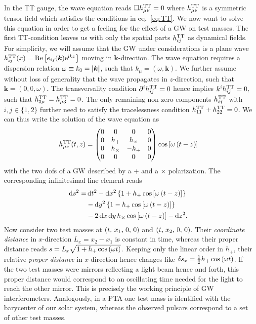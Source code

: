 In the \ac{TT} gauge, the wave equation reads $\square h_{{\mu \nu}}^{\text{TT}} = 0$ where $h_{{\mu \nu}}^{\text{TT}}$ is a symmetric tensor field which satisfies the conditions in eq.~\eqref{eq:TT}. We now want to solve this equation in order to get a feeling for the effect of a \ac{GW} on test masses. The first \ac{TT}-condition leaves us with only the spatial parts $h_{ij}^{\text{TT}}$ as dynamical fields. For simplicity, we will assume that the \ac{GW} under considerations is a  plane wave $h_{ij}^{\text{TT}}(x) = \text{Re} \left[ e_{ij}(\bm{k}) \mathrm{e}^{\mathrm{i}kx} \right]$ moving in $\bm{k}$-direction. The wave equation requires a dispersion relation $\omega \equiv k_0 = \lvert\bm{k}\rvert$, such that $k_\mu = (\omega, \bm{k})$. We further assume without loss of generality that the wave propagates in $z$-direction, such that $\bm{k} = (0,0,\omega)$. The transversality condition $\partial^i h_{ij}^{\text{TT}}=0$ hence implies $k^i h_{ij}^{\text{TT}}=0$, such that $h_{3\mu}^{\text{TT}} = h_{\mu3}^{\text{TT}} = 0$. The only remaining non-zero components $h_{ij}^{\text{TT}}$ with $i, j \in \{1, 2\}$ further need to satisfy the tracelessness condition $h_{11}^{\text{TT}} + h_{22}^{\text{TT}} = 0$. We can thus write the solution of the wave equation as
\begin{align}
	h_{\mu \nu}^{\text{TT}}(t,z) =
	\begin{pmatrix}
		0 &0 &0 &0\\
		0 &h_+ &h_\times &0\\
		0 &h_\times &-h_+ &0\\
		0 &0 &0 &0
	\end{pmatrix}
	\cos \left[ \omega \left( t-z \right) \right]
\end{align}
with the two \acp{dof} of a \ac{GW} described by a $+$ and a $\times$ polarization. The corresponding infinitesimal line element reads
\begin{align}
	\begin{split}
		\mathop{}\!\mathrm{d} s^2 =& \mathop{}\!\mathrm{d} t^2 - \mathop{}\!\mathrm{d} x^2 \left\{ 1 + h_+ \cos \left[ \omega \left( t-z \right) \right] \right\}\\
		&- \mathop{}\!\mathrm{d} y^2 \left\{ 1 - h_+ \cos \left[ \omega \left( t-z \right) \right] \right\} \\
		&- 2 \mathop{}\!\mathrm{d} x \mathop{}\!\mathrm{d} y \, h_\times \cos \left[ \omega \left( t-z \right) \right] - \mathop{}\!\mathrm{d} z^2 .
	\end{split}
\end{align}
Now consider two test masses at $\left( t, \, x_1, \,  0, \, 0 \right)$ and $\left( t, \, x_2, \, 0, \, 0 \right)$. Their  \textit{coordinate distance} in $x$-direction $L_x = x_2 - x_1$ is constant in time, whereas their proper distance reads $s = L_x \sqrt{1 + h_+ \cos\left( \omega t \right)}$. Keeping only the linear order in $h_+$, their relative \textit{proper distance} in $x$-direction hence changes like $\delta s_x =  \frac{1}{2} h_+ \cos \left( \omega t \right)$. If  the two test masses were mirrors reflecting a light beam hence and forth, this proper distance would correspond to an oscillating time needed for the light to reach the other mirror. This is precisely the working principle of \ac{GW} interferometers. Analogously, in a \ac{PTA} one test mass is identified with the barycenter of our solar system, whereas the observed pulsars correspond to a set of other test masses.

